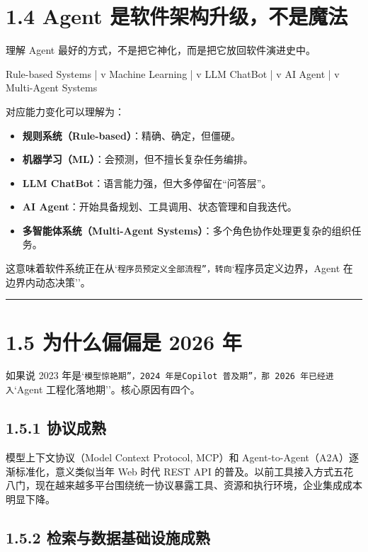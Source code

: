 \section{1.4 Agent 是软件架构升级，不是魔法}

理解 Agent 最好的方式，不是把它神化，而是把它放回软件演进史中。


\begin{codeblock}
Rule-based Systems
      |
      v
Machine Learning
      |
      v
LLM ChatBot
      |
      v
AI Agent
      |
      v
Multi-Agent Systems
\end{codeblock}

对应能力变化可以理解为：


\begin{itemize}[leftmargin=2em]
\item \textbf{规则系统（Rule-based）}：精确、确定，但僵硬。
\item \textbf{机器学习（ML）}：会预测，但不擅长复杂任务编排。
\item \textbf{LLM ChatBot}：语言能力强，但大多停留在``问答层''。
\item \textbf{AI Agent}：开始具备规划、工具调用、状态管理和自我迭代。
\item \textbf{多智能体系统（Multi-Agent Systems）}：多个角色协作处理更复杂的组织任务。
\end{itemize}

这意味着软件系统正在从`\texttt{程序员预定义全部流程''，转向}`程序员定义边界，Agent 在边界内动态决策''。


\bigskip\hrule\bigskip

\section{1.5 为什么偏偏是 2026 年}

如果说 2023 年是`\texttt{模型惊艳期''，2024 年是}\texttt{Copilot 普及期''，那 2026 年已经进入}`Agent 工程化落地期''。核心原因有四个。


\subsection{1.5.1 协议成熟}

模型上下文协议（Model Context Protocol, MCP）和 Agent-to-Agent（A2A）逐渐标准化，意义类似当年 Web 时代 REST API 的普及。以前工具接入方式五花八门，现在越来越多平台围绕统一协议暴露工具、资源和执行环境，企业集成成本明显下降。


\subsection{1.5.2 检索与数据基础设施成熟}

